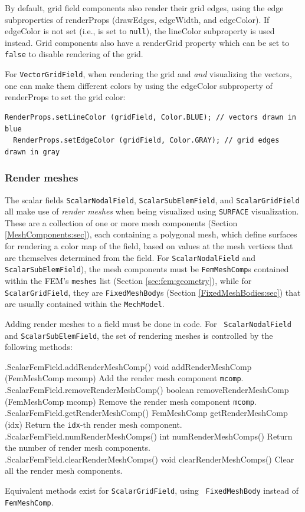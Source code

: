 By default, grid field components also render their grid edges, using
the edge subproperties of {\sf renderProps} ({\sf drawEdges}, {\sf
edgeWidth}, and {\sf edgeColor}). If {\sf edgeColor} is not set (i.e.,
is set to {\tt null}), the {\sf lineColor} subproperty is used instead.
Grid components also have a {\sf renderGrid} property which can be set
to {\tt false} to disable rendering of the grid.

For {\tt VectorGridField}, when rendering the grid and {\it and}
visualizing the vectors, one can make them different colors by using
the {\sf edgeColor} subproperty of {\sf renderProps} to set the grid
color:
%
\begin{lstlisting}[]
  RenderProps.setLineColor (gridField, Color.BLUE); // vectors drawn in blue
  RenderProps.setEdgeColor (gridField, Color.GRAY); // grid edges drawn in gray
\end{lstlisting}
%

\subsubsection{Render meshes}
\label{renderingMeshes:sec}

The scalar fields {\tt ScalarNodalField}, {\tt ScalarSubElemField},
and {\tt ScalarGridField} all make use of {\it render meshes} when
being visualized using {\tt SURFACE} visualization. These are a
collection of one or more mesh components (Section
\ref{MeshComponents:sec}), each containing a polygonal mesh,
which define surfaces for rendering a color map of the field, based on
values at the mesh vertices that are themselves determined from the
field.  For {\tt ScalarNodalField} and {\tt ScalarSubElemField}), the
mesh components must be {\tt FemMeshComp}s contained within the FEM's
{\tt meshes} list (Section \ref{sec:fem:geometry}), while for {\tt
ScalarGridField}, they are {\tt FixedMeshBody}s
(Section \ref{FixedMeshBodies:sec}) that are usually contained within
the {\tt MechModel}.

Adding render meshes to a field must be done in code. For {\tt
ScalarNodalField} and {\tt ScalarSubElemField}, the set of rendering
meshes is controlled by the following methods:
%
\begin{methodtable}{0.55}{0.45}
\midline
%
\methodentry
{\fields.ScalarFemField.addRenderMeshComp()}
{void addRenderMeshComp (FemMeshComp mcomp)}%
{Add the render mesh component {\tt mcomp}.}%
%
\methodentry
{\fields.ScalarFemField.removeRenderMeshComp()}%
{boolean removeRenderMeshComp (FemMeshComp mcomp)}%
{Remove the render mesh component {\tt mcomp}.}%
%
\methodentry
{\fields.ScalarFemField.getRenderMeshComp()}%
{FemMeshComp getRenderMeshComp (idx)}%
{Return the {\tt idx}-th render mesh component.}%
%
\methodentry
{\fields.ScalarFemField.numRenderMeshComps()}%
{int numRenderMeshComps()}%
{Return the number of render mesh components.}%
%
\methodentry
{\fields.ScalarFemField.clearRenderMeshComps()}%
{void clearRenderMeshComps()}%
{Clear all the render mesh components.}%
%
\midline
\end{methodtable}
%
Equivalent methods exist for {\tt ScalarGridField}, using {\tt
FixedMeshBody} instead of {\tt FemMeshComp}.

